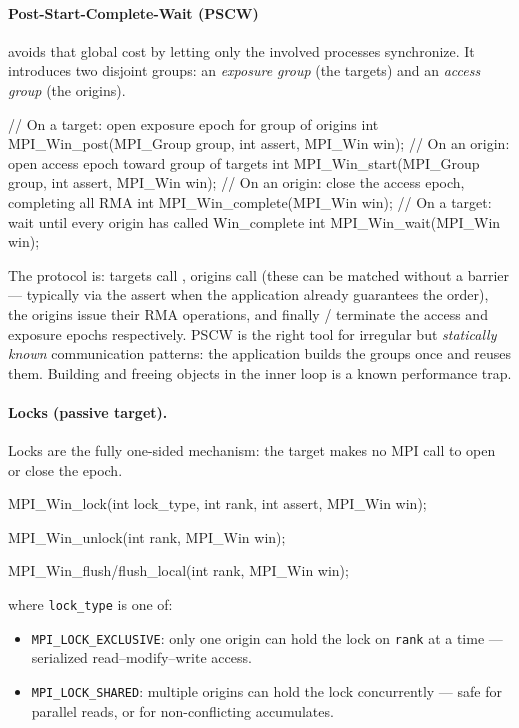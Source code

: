 \paragraph{Post-Start-Complete-Wait (PSCW)} avoids that global cost by letting only the involved processes synchronize. It introduces two disjoint groups: an \emph{exposure group} (the targets) and an \emph{access group} (the origins).

\begin{codeblock}[language=C]
// On a target: open exposure epoch for group of origins
int MPI_Win_post(MPI_Group group, int assert, MPI_Win win);
// On an origin: open access epoch toward group of targets
int MPI_Win_start(MPI_Group group, int assert, MPI_Win win);
// On an origin: close the access epoch, completing all RMA
int MPI_Win_complete(MPI_Win win);
// On a target: wait until every origin has called Win_complete
int MPI_Win_wait(MPI_Win win);
\end{codeblock}

The protocol is: targets call , origins call  (these can be matched without a barrier --- typically via the  assert when the application already guarantees the order), the origins issue their RMA operations, and finally / terminate the access and exposure epochs respectively. PSCW is the right tool for irregular but \emph{statically known} communication patterns: the application builds the groups once and reuses them. Building and freeing  objects in the inner loop is a known performance trap.

\paragraph{Locks (passive target).} Locks are the fully one-sided mechanism: the target makes no MPI call to open or close the epoch.

\begin{codeblock}[language=C]
MPI_Win_lock(int lock_type, int rank, int assert, MPI_Win win);

MPI_Win_unlock(int rank, MPI_Win win);

MPI_Win_flush/flush_local(int rank, MPI_Win win);
\end{codeblock}

where \texttt{lock\_type} is one of:
\begin{itemize}
    \item \texttt{MPI\_LOCK\_EXCLUSIVE}: only one origin can hold the lock on \texttt{rank} at a time --- serialized read--modify--write access.
    \item \texttt{MPI\_LOCK\_SHARED}: multiple origins can hold the lock concurrently --- safe for parallel reads, or for non-conflicting accumulates.
\end{itemize}

